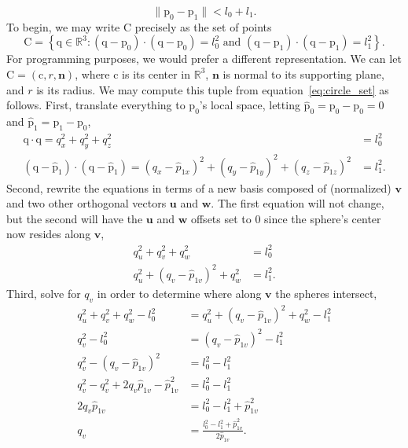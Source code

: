 \documentclass{article}
\newcommand{\mR}[1]{\mathbb{R}^{#1}}
\newcommand{\mPoint}[1]{\mathrm{#1}}
\newcommand{\mPt}[1]{\mPoint{#1}}
\newcommand{\mVector}[1]{\mathbf{#1}}
\newcommand{\mVc}[1]{\mVector{#1}}
\newcommand{\mSet}[1]{\mathrm{#1}}
\newcommand{\mCompound}[1]{\mathrm{#1}}
\begin{document}
\begin{enumerate}
  \begin{equation}
  \|\mPt{p_0}-\mPt{p_1}\|<l_0+l_1. 
  \end{equation}
  To begin, we may write $\mSet{C}$ precisely as the set of points 
  \begin{equation}\label{eq:circle_set}
  \mSet{C} = \left\{\mPt{q} \in \mR{3} : (\mPt{q} - \mPt{p_0})\cdot(\mPt{q} -
  \mPt{p_0})= l_0^2\text{ and } (\mPt{q} - \mPt{p_1})\cdot(\mPt{q} -
  \mPt{p_1})= l_1^2\right\}.
  \end{equation}
  For programming purposes, we would prefer a different representation. We can
  let $\mCompound{C} = (\mPt{c}, r, \mVc{n})$, where $\mPt{c}$ is its center in
  $\mR{3}$, $\mVc{n}$ is normal to its supporting plane, and $r$ is its radius.
  We may compute this tuple from equation~\eqref{eq:circle_set} as follows.
  First, translate everything to $\mPt{p_0}$'s local space, letting
  $\mPt{\hat{p}_0} = \mPt{p_0}-\mPt{p_0}=0$ and $\mPt{\hat{p}_1} =
  \mPt{p_1}-\mPt{p_0}$,
  \begin{align}
  \mPt{q}\cdot\mPt{q} = q_x^2+q_y^2+q_z^2 &= l_0^2 \\ 
  (\mPt{q} - \mPt{\hat{p}_1})\cdot(\mPt{q} - \mPt{\hat{p}_1}) =
  (q_x-\hat{p}_{1x})^2+(q_y-\hat{p}_{1y})^2+(q_z-\hat{p}_{1z})^2 &= l_1^2.
  \end{align} 
  Second, rewrite the equations in terms of a new basis composed of
  (normalized) $\mVc{v}$ and two other orthogonal vectors $\mVc{u}$ and
  $\mVc{w}$. The first equation will not change, but the second will have the
  $\mVc{u}$ and $\mVc{w}$ offsets set to 0 since the sphere's center now resides
  along $\mVc{v}$,
  \begin{align}
  q_u^2+q_v^2+q_w^2 &= l_0^2 \\ 
  q_u^2+(q_v-\hat{p}_{1v})^2+q_w^2 &= l_1^2.
  \end{align}
  Third, solve for $q_v$ in order to determine where along $\mVc{v}$ the spheres
  intersect,
  \begin{align}
  q_u^2+q_v^2+q_w^2-l_0^2 &= q_u^2+(q_v-\hat{p}_{1v})^2+q_w^2-l_1^2 \\
  q_v^2-l_0^2 &= (q_v-\hat{p}_{1v})^2-l_1^2 \\
  q_v^2-(q_v-\hat{p}_{1v})^2 &= l_0^2-l_1^2 \\
  q_v^2-q_v^2+2q_v\hat{p}_{1v}-\hat{p}_{1v}^2 &= l_0^2-l_1^2 \\ 
  2q_v\hat{p}_{1v} &= l_0^2-l_1^2+\hat{p}_{1v}^2 \\
  q_v &= \frac{l_0^2-l_1^2+\hat{p}_{1v}^2}{2\hat{p}_{1v}}. 
  \end{align}

\end{enumerate}
\end{document}
